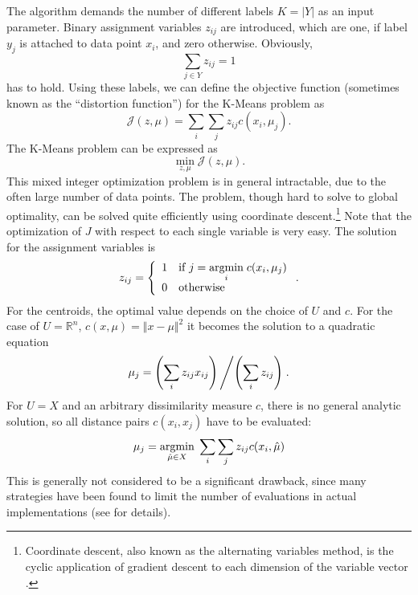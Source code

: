 The algorithm demands the number of different labels $K=|Y|$ as an input parameter.
Binary assignment variables $z_{ij}$ are introduced, which are one, if label $y_j$ is attached to data point $x_i$, and zero otherwise.
Obviously,
\[\sum_{j\in Y}z_{ij} = 1\]
has to hold.
Using these labels, we can define the objective function (sometimes known as the ``distortion function'') for the K-Means problem as
\begin{equation}
  \label{eq:5}
  \mathcal{J}(z, \mu) = \sum_{i}\sum_{j}z_{ij}c(x_i, \mu_j).
\end{equation}
The K-Means problem can be expressed as
\begin{equation}
  \label{eq:3}
  \min\limits_{z, \mu}\mathcal{J}(z, \mu).
\end{equation}
This mixed integer optimization problem is in general intractable, due to the often large number of data points.
The problem, though hard to solve to global optimality, can be solved quite efficiently using coordinate descent.\footnote{Coordinate descent, also known as the alternating variables method, is the cyclic application of gradient descent to each dimension of the variable vector \cite{Nocedal1999}.}
Note that the optimization of $J$ with respect to each single variable is very easy.
The solution for the assignment variables is
\begin{equation}
  \label{eq:4}
  z_{ij} = \left\{\begin{array}{ll}1&\text{if }j=\underset{i}{\operatorname{argmin}}\; c(x_i,\mu_j)\\0&\text{otherwise} \end{array}\right. .
\end{equation}
For the centroids, the optimal value depends on the choice of $U$ and $c$.
For the case of $U=\mathbb{R}^n$, $c(x,\mu) = \Vert x-\mu\Vert^2$ it becomes the solution to a quadratic equation
\begin{equation}
  \label{eq:6}
  \mu_j = \left(\sum_{i}z_{ij}x_{ij}\right)\left / \left(\sum_{i}z_{ij}\right)\right. .
\end{equation}
For $U=X$ and an arbitrary dissimilarity measure $c$, there is no general analytic solution, so all distance pairs $c(x_i, x_j)$ have to be evaluated:
\begin{equation}
  \label{eq:7}
  \mu_j = \underset{\hat{\mu}\in X}{\operatorname{argmin}}\; \sum_{i}\sum_{j}z_{ij}c(x_i,\hat{\mu})
\end{equation}
This is generally not considered to be a significant drawback, since many strategies have been found to limit the number of evaluations in actual implementations (see  for details).

